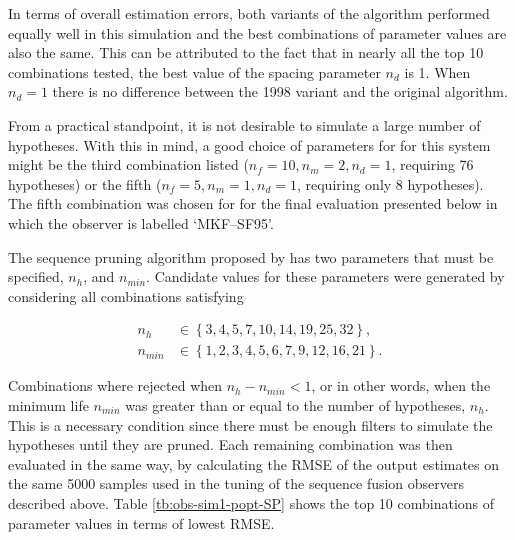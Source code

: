 In terms of overall estimation errors, both variants of the algorithm performed equally well in this simulation and the best combinations of parameter values are also the same. This can be attributed to the fact that in nearly all the top 10 combinations tested, the best value of the spacing parameter $n_d$ is 1. When $n_d=1$ there is no difference between the 1998 variant and the original algorithm.

From a practical standpoint, it is not desirable to simulate a large number of hypotheses. With this in mind, a good choice of parameters for for this system might be the third combination listed ($n_f=10,n_m=2,n_d=1$, requiring 76 hypotheses) or the fifth ($n_f=5,n_m=1,n_d=1$, requiring only 8 hypotheses). The fifth combination was chosen for for the final evaluation presented below in which the observer is labelled `MKF--SF95'.

The sequence pruning algorithm proposed by \cite{eriksson_classification_1996} has two parameters that must be specified, $n_h$, and $n_{min}$. Candidate values for these parameters were generated by considering all combinations satisfying

\begin{equation} \label{eq:sim-sys-siso-MKF-SP-param-values}
	\begin{aligned}
		n_h &\in \left\{3, 4, 5, 7, 10, 14, 19, 25, 32\right\},  \\
			n_{min} &\in \left\{1, 2, 3, 4, 5, 6, 7, 9, 12, 16, 21\right\}.
		\end{aligned}
	\end{equation}

Combinations where rejected when $n_h - n_{min} < 1$, or in other words, when the minimum life $n_{min}$ was greater than or equal to the number of hypotheses, $n_h$. This is a necessary condition since there must be enough filters to simulate the hypotheses until they are pruned. Each remaining combination was then evaluated in the same way, by calculating the \gls{RMSE} of the output estimates on the same 5000 samples used in the tuning of the sequence fusion observers described above. Table \ref{tb:obs-sim1-popt-SP} shows the top 10 combinations of parameter values in terms of lowest \gls{RMSE}.

